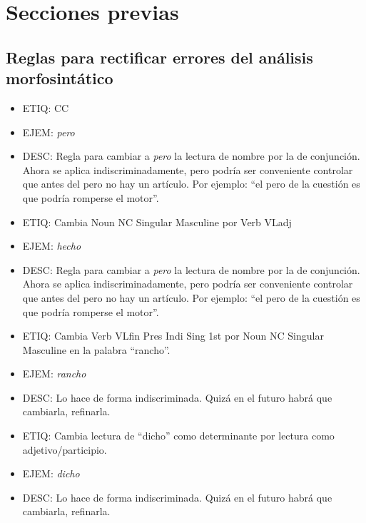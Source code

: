 \documentclass[11pt]{report}
\begin{document}
\part{Secciones previas}
\chapter{Reglas para rectificar errores del análisis morfosintático}
\begin{itemize}
\item ETIQ: CC
\item EJEM: \emph{pero} 
\item DESC: Regla para cambiar a \emph{pero} la lectura de nombre por la de conjunción. Ahora se aplica indiscriminadamente, pero podría ser conveniente controlar que antes del pero no hay un artículo. Por ejemplo: ``el pero de la cuestión es que podría romperse el motor''.
\end{itemize}

\begin{itemize}
\item ETIQ: Cambia Noun NC Singular Masculine por Verb VLadj
\item EJEM: \emph{hecho} 
\item DESC: Regla para cambiar a \emph{pero} la lectura de nombre por la de conjunción. Ahora se aplica indiscriminadamente, pero podría ser conveniente controlar que antes del pero no hay un artículo. Por ejemplo: ``el pero de la cuestión es que podría romperse el motor''.
\end{itemize}

\begin{itemize}
\item ETIQ: Cambia Verb VLfin Pres Indi Sing 1st por Noun NC Singular Masculine en la palabra ``rancho''.
\item EJEM: \emph{rancho} 
\item DESC: Lo hace de forma indiscriminada. Quizá en el futuro habrá que cambiarla, refinarla.
\end{itemize}

\begin{itemize}
\item ETIQ: Cambia lectura de ``dicho'' como determinante por lectura como adjetivo/participio.
\item EJEM: \emph{dicho} 
\item DESC: Lo hace de forma indiscriminada. Quizá en el futuro habrá que cambiarla, refinarla.
\end{itemize}
\end{document}
